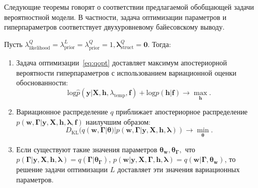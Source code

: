 Следующие теоремы говорят о соответствии предлагаемой обобщающей задачи вероятностной модели. В частности, задача оптимизации параметров и гиперпараметров соответствует двухуровневому байесовскому выводу.
\begin{theorem}
Пусть ${\lambda^Q_\text{likelihood}} = {\lambda^L_\text{prior}=\lambda^Q_\text{prior}}=1, {\boldsymbol{\lambda}^Q_{\text{struct}}}=\mathbf{0}$. Тогда:
\begin{enumerate}
\item Задача оптимизации~\eqref{eq:qopt} доставляет максимум апостериорной вероятности гиперпараметров с использованием вариационной оценки обоснованности:
\vspace{-0.3cm}
\[
    \text{log}\hat{p}(\mathbf{y}|\mathbf{X}, \mathbf{h}, \lambda_\text{temp}, \mathbf{f})+{\text{log}p(\mathbf{h}|\mathbf{f})} \to \max_{\mathbf{h}}.
\]
\item Вариационное распределение $q$ приближает апостериорное распределение $p(\mathbf{w}, \boldsymbol{\Gamma}|\mathbf{y}, \mathbf{X}, \mathbf{h}, \boldsymbol{\lambda}, \mathbf{f})$ наилучшим образом:
\vspace{-0.3cm}
\[
    {D}_\text{KL}(q(\mathbf{w}, \boldsymbol{\Gamma}|\boldsymbol{\theta})|p(\mathbf{w}, \boldsymbol{\Gamma}|\mathbf{y}, \mathbf{X}, \mathbf{h}, \boldsymbol{\lambda})) \to \min_{\boldsymbol{\theta}}.
\]


\item Если существуют такие значения параметров $\boldsymbol{\theta}_\mathbf{w}, \boldsymbol{\theta}_{\boldsymbol{\Gamma}},$ что $p(\boldsymbol{\Gamma}|\mathbf{y}, \mathbf{X}, \mathbf{h}, \boldsymbol{\lambda}) = q(\boldsymbol{\Gamma}|\boldsymbol{\theta}_{\boldsymbol{\Gamma}})$, $p(\mathbf{w}| \mathbf{y}, \mathbf{X}, \boldsymbol{\Gamma}, \mathbf{h}, \boldsymbol{\lambda}) = q(\mathbf{w}|\boldsymbol{\Gamma}, \boldsymbol{\theta}_{\mathbf{w}})$,
то решение задачи оптимизации $L$ доставляет эти значения вариационных параметров.  
\end{enumerate}
\end{theorem}

